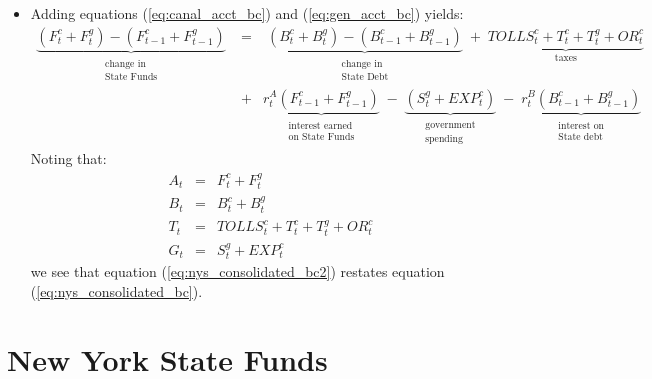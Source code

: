 \documentclass[11pt]{article}
\begin{document}
\begin{itemize}
\item Adding equations (\ref{eq:canal_acct_bc}) and (\ref{eq:gen_acct_bc}) yields:
\begin{eqnarray}
\underbrace{(F^c_t+ F^g_t) - (F^c_{t-1}+F^g_{t-1})}_{\substack{\text{change in}\\ \text{State Funds}}} \; &=& \; \underbrace{(B^c_t + B^g_t) - (B^c_{t-1} + B^g_{t-1})}_{\substack{\text{change in}\\ \text{State Debt}}} \; + \;
\underbrace{TOLLS^c_t + T^c_t + T^g_t + OR^c_t}_{\text{taxes}} \nonumber \\
&+&
\underbrace{r_t^A (F^c_{t-1} + F^g_{t-1})}_{\substack{\text{interest earned}\\ \text{on State Funds}}} 
 \; - \;
\underbrace{(S^g_t + EXP^c_t)}_{\substack{\text{government}\\ \text{spending}}} \; - \;
\underbrace{r_t^B (B^c_{t-1} + B^g_{t-1})}_{\substack{\text{interest on}\\ \text{State debt}}} 
\label{eq:nys_consolidated_bc2}
\end{eqnarray}
Noting that:
\begin{eqnarray*}
A_t &=& F^c_t+ F^g_t   \\
B_t &=& B^c_t+ B^g_t     \\
T_t &=& TOLLS^c_t + T^c_t + T^g_t + OR^c_t \\
G_t &=& S^g_t + EXP^c_t
\end{eqnarray*}
we see that equation (\ref{eq:nys_consolidated_bc2}) restates equation (\ref{eq:nys_consolidated_bc}).

\end{itemize}

\newpage

\section{New York State Funds}
\end{document}
